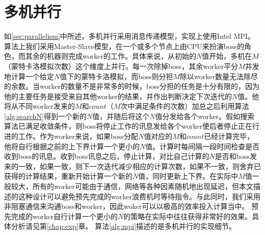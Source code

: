 \section{多机并行}
\label{sec:multiparallel}
如\ref{sec:parallelism}中所述，多机并行采用消息传递模型，实现上使用Intel MPI。算法上我们采用Master-Slave模型，在一个或多个节点上由CPU来扮演boss的角色，而其余的机器则完成worker的工作。具体来说，从初始的$N$值开始，多机在$M$（蒙特卡洛模拟次数）这个维度上并行。每一次除掉boss，其余worker平分$M$并发地计算一个给定$N$值下的蒙特卡洛模拟，而boss则分担$M$除以worker数量无法除尽的余数。当worker的数量不是非常多的时候，boss分担的任务是十分有限的，因为他的主要任务是接受来自其他worker的结果，并作出判断决定下次迭代的$N$值。他将从不同worker发来的$M$和$count$（$M$次中满足条件的次数）加总之后利用算法\ref{alg:searchN}得到一个新的$N$值，并随后将这个$N$值分发给各个worker。假如搜索算法已满足收敛条件，则boss将停止工作的讯息发给各个worker使后者停止正在行进的工作。作为worker来说，如果boss分配$N$值对应的$M$和$count$已经计算完毕，他将自行根据之前的上下界计算一个更小的$N$值。计算时每间隔一段时间检查是否收到boss的讯息。收到boss讯息之后，停止计算，对比自己计算的$N$是否和boss发来的一致，如果一致，则下一次迭代减少相应的计算次数，如果不一致，则舍弃已获得的计算结果，重新开始计算一个新的$N$值，同时更新上下界。在实际中$M$值一般较大，所有的worker可能由于通信，网络等各种因素随机地出现延迟，但本文描述的这种设计可以避免预先完成的worker浪费机时等待指令。与此同时，我们采用非阻塞通信来沟通boss和worker，因此woker可以以极高的效率投入计算当中。
预先完成的worker自行计算一个更小的$N$的策略在实际中往往获得非常好的效果。具体分析请见第\ref{chap:exp}章。
算法\ref{alg:mpi}描述的是多机并行的实现细节。
